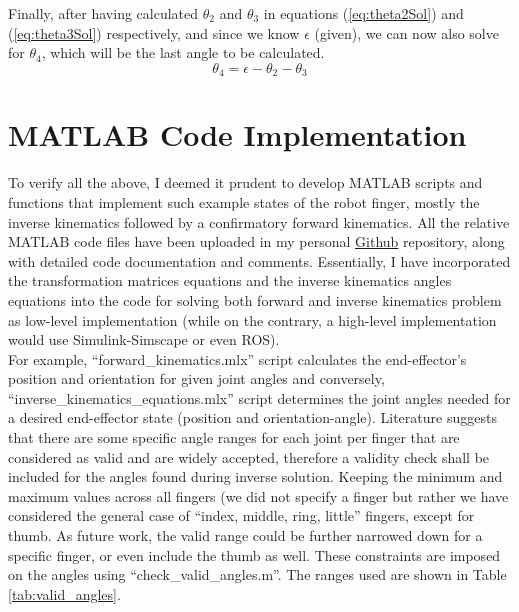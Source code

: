 \documentclass[a4paper,12pt]{article}
\begin{document}
Finally, after having calculated $\theta_{2}$ and $\theta_{3}$ in equations (\ref{eq:theta2Sol}) and (\ref{eq:theta3Sol}) respectively, and since we know $\epsilon$ (given), we can now also solve for $\theta_{4}$, which will be the last angle to be calculated.
\begin{equation}
\label{eq:theta4Sol}
     \boxed{\theta_{4} = \epsilon - \theta_{2} - \theta_{3}}
\end{equation}


\section{MATLAB Code Implementation}
To verify all the above, I deemed it prudent to develop MATLAB scripts and functions that implement such example states of the robot finger, mostly the inverse kinematics followed by a confirmatory forward kinematics. All the relative MATLAB code files have been uploaded in my personal \href{https://github.com/Inglezos/BME_Robotic_Finger_Project}{Github} repository, along with detailed code documentation and comments. Essentially, I have incorporated the transformation matrices equations and the inverse kinematics angles equations into the code for solving both forward and inverse kinematics problem as low-level implementation (while on the contrary, a high-level implementation would use Simulink-Simscape or even ROS).\\

For example, ``forward\_kinematics.mlx'' script calculates the end-effector's position and orientation for given joint angles and conversely, ``inverse\_kinematics\_equations.mlx'' script determines the joint angles needed for a desired end-effector state (position and orientation-angle). Literature suggests \cite{CheckValidAngles_BEST_chen2013constraint, CheckValidAngles_cobos2008efficient, CheckValidAngles_lee2014flexion, CheckValidAngles_ngeo2014continuous} that there are some specific angle ranges for each joint per finger that are considered as valid and are widely accepted, therefore a validity check shall be included for the angles found during inverse solution. Keeping the minimum and maximum values across all fingers (we did not specify a finger but rather we have considered the general case of ``index, middle, ring, little'' fingers, except for thumb. As future work, the valid range could be further narrowed down for a specific finger, or even include the thumb as well. These constraints are imposed on the angles using ``check\_valid\_angles.m''. The ranges used are shown in Table \ref{tab:valid_angles}.
\end{document}
